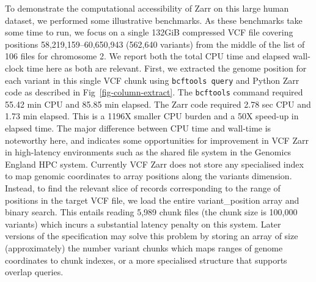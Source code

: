 \documentclass[a4paper,num-refs]{oup-contemporary}
\begin{document}
To demonstrate the computational accessibility of Zarr on this 
large human dataset, we performed some illustrative benchmarks.
As these benchmarks take some time to run, we focus 
on a single 132GiB compressed VCF file covering
positions 58,219,159--60,650,943 (562,640 variants) 
from the middle of the list of 106 files for chromosome 2.
We report both the total CPU time and elapsed wall-clock time here
as both are relevant.
First, we extracted the genome position for each variant in this single VCF 
chunk using \texttt{bcftools query} and Python Zarr code as described in 
Fig~\ref{fig-column-extract}. The \texttt{bcftools} command required 
55.42 min CPU and 85.85 min elapsed.
The Zarr code required 2.78 sec CPU and 1.73 min elapsed.
This is a 1196X smaller CPU burden and a 50X speed-up in elapsed time.
The major difference between CPU time and wall-time is noteworthy 
here, and indicates some opportunities for improvement in VCF Zarr
in high-latency environments such as the shared file system in the
Genomics England HPC system. Currently VCF Zarr does not store any
specialised index to map genomic coordinates to array positions
along the variants dimension. Instead, to find the relevant slice
of records corresponding to the range of positions in the target
VCF file, we load the entire variant\_position array and 
binary search. This entails reading 5,989 chunk files
(the chunk size is 100,000 variants) which incurs a substantial
latency penalty on this system. Later versions of the specification
may solve this problem by storing an array of size 
(approximately) the number variant chunks 
which maps ranges of genome coordinates to chunk indexes,
or a more specialised structure that supports overlap queries.

\end{document}
